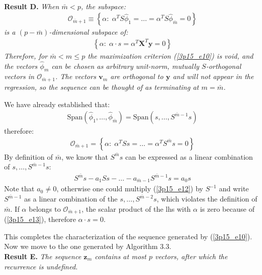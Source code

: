 \hspace{0.5cm}\\
\textbf{Result D.} \textit{When $\bar{m} < p$, the subspace:
	\begin{eqnarray*}
		\mathcal{O}_{\bar{m} + 1} \equiv \left\{ \alpha: \; \alpha^T S \hat{\phi} _{1} = \ldots =  \alpha^T S \hat{\phi} _{ \bar{m}} = 0 \right\}
	\end{eqnarray*} is a $(p - \bar{m})$-dimensional subspace of:
\begin{eqnarray*}
	\left\{ \alpha: \; \alpha \cdot s = \alpha^T \mathbf{X}^T \mathbf{y} = 0\right\}
\end{eqnarray*}
Therefore, for $\bar{m} < m \leq p$ the maximization criterion (\ref{3p15_e10}) is void, and
the vectors $\hat{\phi}_m$ can be chosen as arbitrary unit-norm, mutually $S$-orthogonal
vectors in $\mathcal{O}_{\bar{m} + 1}$. The vectors $\mathbf{v}_m$ are orthogonal to $\mathbf{y}$ and will not appear in the regression, so the sequence can be thought of as terminating at $m = \bar{m}$.
}

\noindent We have already established that:
\begin{eqnarray*}
\textrm{Span} \left( \hat{\phi}_1, \ldots, \hat{\phi}_{\bar{m}} \right) = 
\textrm{Span} \left( s, \ldots, S^{\bar{m} - 1} s \right)
\end{eqnarray*}
therefore:
\begin{eqnarray} \label{3p15_e13}
\mathcal{O}_{\bar{m} + 1} = \left\{ \alpha: \; \alpha^T S s = \ldots = \alpha^T S^{\bar{m}} s = 0 \right\}	
\end{eqnarray}
By definition of $\bar{m}$, we know that $S^{\bar{m}} s$ can be expressed as a linear combination 
of $s, \ldots, S^{\bar{m} - 1}s$:
\begin{eqnarray} \label{3p15_e12}
S^{\bar{m}} s - a_1 S s - \ldots - a_{\bar{m} - 1} S^{\bar{m} - 1} s = a_0 s
\end{eqnarray}
Note that $a_0 \neq 0$, otherwise one could multiply (\ref{3p15_e12}) by $S^{-1}$ and write $S^{\bar{m} - 1}$ as a linear combination of the $s, \ldots, S^{\bar{m} - 2}s$, which
violates the definition of $\bar{m}$. If $\alpha$ belongs to $\mathcal{O}_{\bar{m} + 1}$,
the scalar product of the lhs with $\alpha$ is zero because of (\ref{3p15_e13}), therefore
$\alpha \cdot s = 0$.

This completes the characterization of the sequence generated by (\ref{3p15_e10}). Now we
move to the one generated by Algorithm 3.3.
\vspace{0.5cm}\\
\noindent \textbf{Result E.} \textit{The sequence $\mathbf{z}_m$ contains at most $p$ vectors, after
which the recurrence is undefined.}

